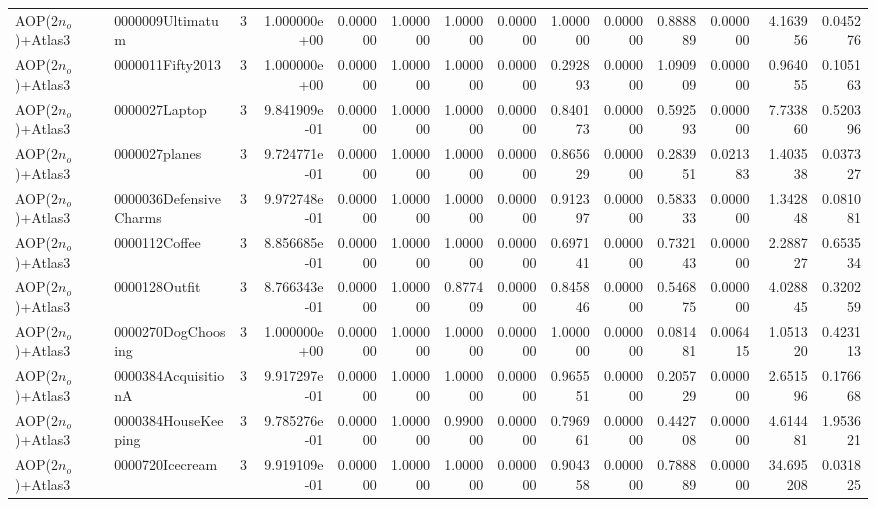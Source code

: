 \begin{tabular}{llrr|r|rr|rr|rr|rrr}
      AOP($2 n_o$)+Atlas3 &       0000009Ultimatum &       3 & 1.000000e+00 & 0.000000 & 1.000000 &      1.000000 & 0.000000 &      1.000000 & 0.000000 &      0.888889 &    0.000000 &     4.163956 &    0.045276 \\
      AOP($2 n_o$)+Atlas3 &       0000011Fifty2013 &       3 & 1.000000e+00 & 0.000000 & 1.000000 &      1.000000 & 0.000000 &      0.292893 & 0.000000 &      1.090909 &    0.000000 &     0.964055 &    0.105163 \\
      AOP($2 n_o$)+Atlas3 &          0000027Laptop &       3 & 9.841909e-01 & 0.000000 & 1.000000 &      1.000000 & 0.000000 &      0.840173 & 0.000000 &      0.592593 &    0.000000 &     7.733860 &    0.520396 \\
      AOP($2 n_o$)+Atlas3 &          0000027planes &       3 & 9.724771e-01 & 0.000000 & 1.000000 &      1.000000 & 0.000000 &      0.865629 & 0.000000 &      0.283951 &    0.021383 &     1.403538 &    0.037327 \\
      AOP($2 n_o$)+Atlas3 & 0000036DefensiveCharms &       3 & 9.972748e-01 & 0.000000 & 1.000000 &      1.000000 & 0.000000 &      0.912397 & 0.000000 &      0.583333 &    0.000000 &     1.342848 &    0.081081 \\
      AOP($2 n_o$)+Atlas3 &          0000112Coffee &       3 & 8.856685e-01 & 0.000000 & 1.000000 &      1.000000 & 0.000000 &      0.697141 & 0.000000 &      0.732143 &    0.000000 &     2.288727 &    0.653534 \\
      AOP($2 n_o$)+Atlas3 &          0000128Outfit &       3 & 8.766343e-01 & 0.000000 & 1.000000 &      0.877409 & 0.000000 &      0.845846 & 0.000000 &      0.546875 &    0.000000 &     4.028845 &    0.320259 \\
      AOP($2 n_o$)+Atlas3 &     0000270DogChoosing &       3 & 1.000000e+00 & 0.000000 & 1.000000 &      1.000000 & 0.000000 &      1.000000 & 0.000000 &      0.081481 &    0.006415 &     1.051320 &    0.423113 \\
      AOP($2 n_o$)+Atlas3 &    0000384AcquisitionA &       3 & 9.917297e-01 & 0.000000 & 1.000000 &      1.000000 & 0.000000 &      0.965551 & 0.000000 &      0.205729 &    0.000000 &     2.651596 &    0.176668 \\
      AOP($2 n_o$)+Atlas3 &    0000384HouseKeeping &       3 & 9.785276e-01 & 0.000000 & 1.000000 &      0.990000 & 0.000000 &      0.796961 & 0.000000 &      0.442708 &    0.000000 &     4.614481 &    1.953621 \\
      AOP($2 n_o$)+Atlas3 &        0000720Icecream &       3 & 9.919109e-01 & 0.000000 & 1.000000 &      1.000000 & 0.000000 &      0.904358 & 0.000000 &      0.788889 &    0.000000 &    34.695208 &    0.031825 \\

\end{tabular}
